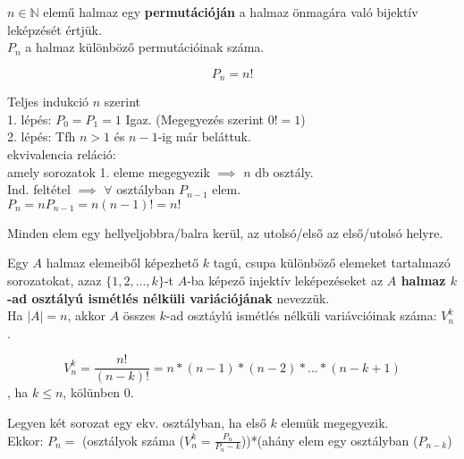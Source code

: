 \begin{frame}
  \begin{tcolorbox}[title={Def.: Permutáció}]
    $n \in \mathbb{N}$ elemű halmaz egy \textbf{permutációján} a halmaz önmagára való bijektív leképzését értjük.\\
    $P_n$ a halmaz különböző permutációinak száma.
  \end{tcolorbox}

  \begin{tcolorbox}[title={Tétel: Permutációk száma}]
    $$P_n = n!$$
  \end{tcolorbox}

  \begin{tcolorbox}[title={Bizonyítás}]
    Teljes indukció $n$ szerint\\
    1. lépés: $P_0 = P_1 = 1$ Igaz. (Megegyezés szerint $0! = 1$)\\
    2. lépés: Tfh $n > 1$ és $n - 1$-ig már beláttuk.\\
    ekvivalencia reláció:\\
    amely sorozatok 1. eleme megegyezik $\implies$ $n$ db osztály.\\
    Ind. feltétel $\implies$ $\forall$ osztályban $P_{n - 1}$ elem.\\
    $P_n = nP_{n - 1} = n(n - 1)! = n!$
  \end{tcolorbox}

  \begin{tcolorbox}[title={Def.: Ciklikus permutáció}]
    Minden elem egy hellyeljobbra/balra kerül, az utolsó/első az első/utolsó helyre.
  \end{tcolorbox}
\end{frame}

\begin{frame}
  \begin{tcolorbox}[title={Def.:Ismétlés nélküli variáció}]
    Egy $A$ halmaz elemeiből képezhető $k$ tagú, csupa különböző elemeket tartalmazó sorozatokat, azaz $\{ 1, 2, ..., k \}$-t $A$-ba képező injektív leképezéseket az \textbf{$A$ halmaz  $k$-ad osztályú ismétlés nélküli variációjának} nevezzük.\\
    Ha $|A| = n$, akkor $A$ összes $k$-ad osztáylú ismétlés nélküli variávcióinak száma: $V_n^k$.
  \end{tcolorbox}

  \begin{tcolorbox}[title={Tétel: Variációk száma}]
    $$V_n^k = \frac{n!}{(n - k)!} = n * (n - 1) * (n - 2) * ... * (n - k + 1)$$, ha $k \leq n$, kölünben 0.
  \end{tcolorbox}

  \begin{tcolorbox}[title={Bizonyítás}]
    Legyen két sorozat egy ekv. osztályban, ha első $k$ elemük megegyezik.\\
    Ekkor: $P_n = $ (osztályok száma ($V_n^k = \frac{P_n}{P_n - k}$))*(ahány elem egy osztályban ($P_{n - k}$)
  \end{tcolorbox}
\end{frame}

